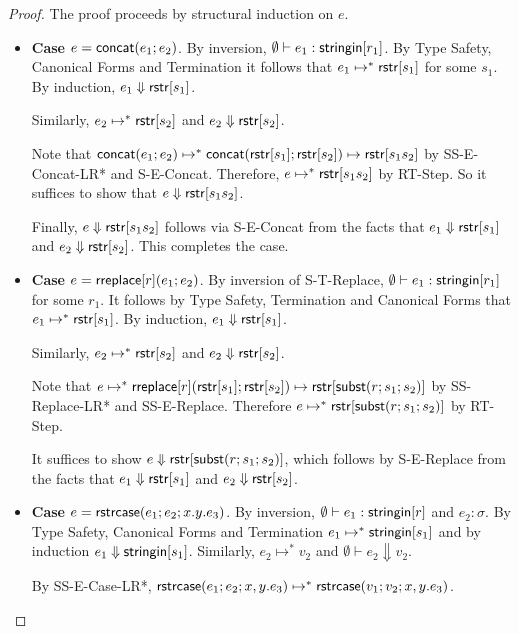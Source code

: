 \documentclass[11pt,leqno]{article}
\theoremstyle{definition}
\newcommand{\stringin}[1]{{\sf stringin}[#1]}
\newcommand{\lsubst}[3]{{\sf subst}(#1;#2;#3)} %
\newcommand{\strcase}[3]{ {\sf rstrcase}(#1; #2; #3)}
\newcommand{\sreduces}{ \Downarrow }
\begin{document}
\begin{proof}
The proof proceeds by structural induction on $e$.

\begin{itemize}[label=$ $,itemsep=1ex]

\item \textbf{Case $e = {\sf concat}(e_1;e_2)$}.
By inversion, $\emptyset\vdash e_1 : \stringin{r_1}$.
By Type Safety, Canonical Forms and Termination it follows that $e_1 \mapsto^* {\sf rstr}[s_1]$ for some $s_1$.
By induction, $e_1 \sreduces \rstr{s_1}$.

Similarly, $e_2 \mapsto^* {\sf rstr}[s_2]$ and $e_2 \sreduces \rstr{s_2}$.

Note that ${\sf concat}(e_1;e_2) \mapsto^* {\sf concat}({\sf rstr}[s_1];{\sf rstr}[s_2]) \mapsto {\sf rstr}[s_1s_2]$ by SS-E-Concat-LR* and S-E-Concat.
Therefore, $e \mapsto^* {\sf rstr}[s_1s_2]$ by RT-Step. So it suffices to show that $e \sreduces \rstr{s_1s_2}$.

Finally, $e \sreduces \rstr{s_1s_2}$ follows via S-E-Concat from the facts that $e_1 \sreduces \rstr{s_1}$ and $e_2 \sreduces \rstr{s_2}$.
This completes the case. 

\item \textbf{Case $e = {\sf rreplace}[r](e_1;e_2)$}.
By inversion of S-T-Replace, $\emptyset\vdash e_1 : \stringin{r_1}$ for some $r_1$.
It follows by Type Safety, Termination and Canonical Forms that $e_1 \mapsto^* {\sf rstr}[s_1]$.
By induction, $e_1 \sreduces \rstr{s_1}$.

Similarly, $e_2 \mapsto^* {\sf rstr}[s_2]$ and $e_2 \sreduces \rstr{s_2}$.

Note that $e \mapsto^* \rreplace{r}{\rstr{s_1}}{\rstr{s_2}} \mapsto \rstr{\lsubst{r}{s_1}{s_2}}$ by SS-Replace-LR* and SS-E-Replace.
Therefore $e \mapsto^* \rstr{\lsubst{r}{s_1}{s_2}}$ by RT-Step. 

It suffices to show $e \sreduces \rstr{\lsubst{r}{s_1}{s_2}}$, which follows by S-E-Replace from the facts that $e_1 \sreduces \rstr{s_1}$ and
$e_2 \sreduces \rstr{s_2}$.


\item \textbf{Case $e = \strcase{e_1}{e_2}{x.y.e_3}$}.
By inversion, $\emptyset\vdash e_1 : \stringin{r}$ and $e_2 : \sigma$.
By Type Safety, Canonical Forms and Termination $e_1 \mapsto^* \stringin{s_1}$ and by induction $e_1 \sreduces \stringin{s_1}$.
Similarly, $e_2 \mapsto^* v_2$ and $\emptyset\vdash e_2 \sreduces v_2$.

By SS-E-Case-LR*, $\strcase{e_1}{e_2}{x,y.e_3} \mapsto^* \strcase{v_1}{v_2}{x,y.e_3}$.


\end{itemize}
\end{proof}
\end{document}
